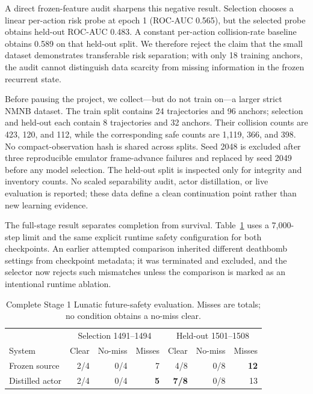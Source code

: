 \documentclass[10pt]{article}
\begin{document}
A direct frozen-feature audit sharpens this negative result.  Selection chooses
a linear per-action risk probe at epoch 1 (ROC-AUC 0.565), but the selected
probe obtains held-out ROC-AUC 0.483.  A constant per-action collision-rate
baseline obtains 0.589 on that held-out split.  We therefore reject the claim
that the small dataset demonstrates transferable risk separation; with only 18
training anchors, the audit cannot distinguish data scarcity from missing
information in the frozen recurrent state.

Before pausing the project, we collect---but do not train on---a larger strict
NMNB dataset.  The train split contains 24 trajectories and 96 anchors;
selection and held-out each contain 8 trajectories and 32 anchors.  Their
collision counts are 423, 120, and 112, while the corresponding safe counts are
1,119, 366, and 398.  No compact-observation hash is shared across splits.
Seed 2048 is excluded after three reproducible emulator frame-advance failures
and replaced by seed 2049 before any model selection.  The held-out split is
inspected only for integrity and inventory counts.  No scaled separability
audit, actor distillation, or live evaluation is reported; these data define a
clean continuation point rather than new learning evidence.

The full-stage result separates completion from survival.  Table~\ref{tab:full-risk}
uses a 7,000-step limit and the same explicit runtime safety configuration for
both checkpoints.  An earlier attempted comparison inherited different
deathbomb settings from checkpoint metadata; it was terminated and excluded,
and the selector now rejects such mismatches unless the comparison is marked as
an intentional runtime ablation.

\begin{table}[ht]
  \centering
  \caption{Complete Stage 1 Lunatic future-safety evaluation.  Misses are
  totals; no condition obtains a no-miss clear.}
  \label{tab:full-risk}
  \begin{tabular}{lrrrrrr}
    \toprule
    & \multicolumn{3}{c}{Selection 1491--1494} &
      \multicolumn{3}{c}{Held-out 1501--1508} \\
    System & Clear & No-miss & Misses & Clear & No-miss & Misses \\
    \midrule
    Frozen source & 2/4 & 0/4 & 7 & 4/8 & 0/8 & \textbf{12} \\
    Distilled actor & 2/4 & 0/4 & \textbf{5} & \textbf{7/8} & 0/8 & 13 \\
    \bottomrule
  \end{tabular}
\end{table}
\end{document}
